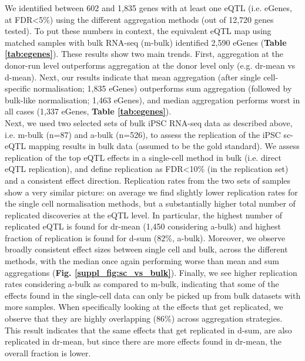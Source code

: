 We identified between 602 and 1,835 genes with at least one eQTL (i.e. eGenes, at FDR<5\%) using the different aggregation methods (out of 12,720 genes tested). 
To put these numbers in context, the equivalent eQTL map using matched samples with bulk RNA-seq (m-bulk) identified 2,590 eGenes (\textbf{Table \ref{tab:egenes}}). 
These results show two main trends. 
First, aggregation at the donor-run level outperforms aggregation at the donor level only (e.g. dr-mean vs d-mean). 
Next, our results indicate that mean aggregation (after single cell-specific normalisation; 1,835 eGenes) outperforms sum aggregation (followed by bulk-like normalisation; 1,463 eGenes), and median aggregation performs worst in all cases (1,337 eGenes, \textbf{Table \ref{tab:egenes}}). \\

Next, we used two selected sets of bulk iPSC RNA-seq data as described above, i.e. m-bulk (n=87) and a-bulk (n=526), to assess the replication of the iPSC sc-eQTL mapping results in bulk data (assumed to be the gold standard). 
We assess replication of the top eQTL effects in a single-cell method in bulk (i.e. direct eQTL replication), and define replication as FDR<10\% (in the replication set) and a consistent effect direction. 
Replication rates from the two sets of samples show a very similar picture: on average we find slightly lower replication rates for the single cell normalisation methods, but a substantially higher total number of replicated discoveries at the eQTL level. 
In particular, the highest number of replicated eQTL is found for dr-mean (1,450 considering a-bulk) and highest fraction of replication is found for d-sum (82\%, a-bulk).
Moreover, we observe broadly consistent effect sizes between single cell and bulk, across the different methods, with the median once again performing worse than mean and sum aggregations (\textbf{Fig. \ref{suppl_fig:sc_vs_bulk}}).
Finally, we see higher replication rates considering a-bulk as compared to m-bulk, indicating that some of the effects found in the single-cell data can only be picked up from bulk datasets with more samples.
When specifically looking at the effects that get replicated, we observe that they are highly overlapping (86\%) across aggregation strategies. 
This result indicates that the same effects that get replicated in d-sum, are also replicated in dr-mean, but since there are more effects found in dr-mean, the overall fraction is lower. \\

